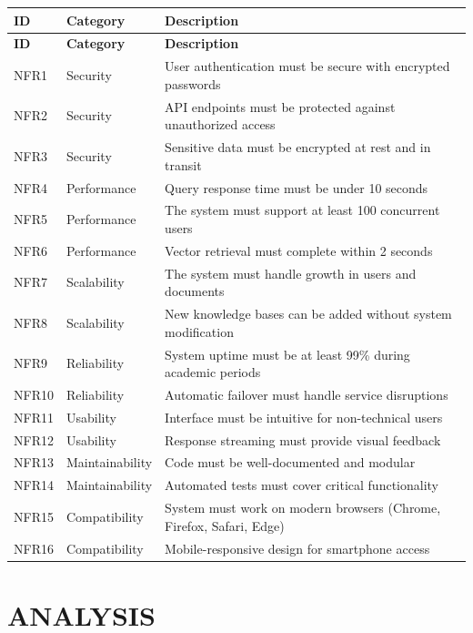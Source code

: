 \documentclass[12pt,a4paper]{book}
\numberwithin{table}{chapter}
\numberwithin{figure}{chapter}
\numberwithin{equation}{chapter}
\begin{document}
\begin{longtable}{|p{0.5in}|p{1.5in}|p{3in}|}
\hline
\textbf{ID} & \textbf{Category} & \textbf{Description}\\
\hline
\endfirsthead
\hline
\textbf{ID} & \textbf{Category} & \textbf{Description}\\
\hline
\endhead
\hline
NFR1 & Security & User authentication must be secure with encrypted passwords\\
\hline
NFR2 & Security & API endpoints must be protected against unauthorized access\\
\hline
NFR3 & Security & Sensitive data must be encrypted at rest and in transit\\
\hline
NFR4 & Performance & Query response time must be under 10 seconds\\
\hline
NFR5 & Performance & The system must support at least 100 concurrent users\\
\hline
NFR6 & Performance & Vector retrieval must complete within 2 seconds\\
\hline
NFR7 & Scalability & The system must handle growth in users and documents\\
\hline
NFR8 & Scalability & New knowledge bases can be added without system modification\\
\hline
NFR9 & Reliability & System uptime must be at least 99\% during academic periods\\
\hline
NFR10 & Reliability & Automatic failover must handle service disruptions\\
\hline
NFR11 & Usability & Interface must be intuitive for non-technical users\\
\hline
NFR12 & Usability & Response streaming must provide visual feedback\\
\hline
NFR13 & Maintainability & Code must be well-documented and modular\\
\hline
NFR14 & Maintainability & Automated tests must cover critical functionality\\
\hline
NFR15 & Compatibility & System must work on modern browsers (Chrome, Firefox, Safari, Edge)\\
\hline
NFR16 & Compatibility & Mobile-responsive design for smartphone access\\
\hline
\end{longtable}

\clearpage

\chapter{ANALYSIS}
\end{document}
